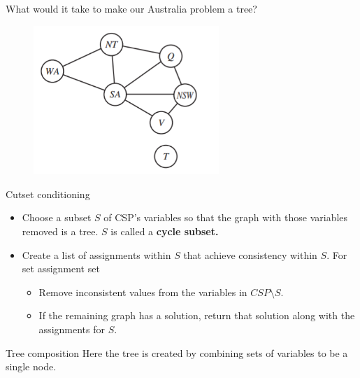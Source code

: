 \documentclass{beamer}
\begin{document}
\begin{frame}{What would it take to make our Australia problem a tree?}
    \begin{figure}
        \includegraphics[width=7cm]{images/map_graph}
    \end{figure}
    
\end{frame}

\begin{frame}{Cutset conditioning}
    \begin{itemize}
        \item Choose a subset $S$ of CSP's variables so that the graph with those
        variables removed is a tree. $S$ is called a {\bf cycle subset.}
        \item Create a list of assignments within $S$ that achieve consistency within $S$. For set assignment set
        \begin{itemize}
            \item Remove inconsistent values from the variables in $CSP\setminus S$.
            \item If the remaining graph has a solution, return that solution along with the assignments for $S$.
        \end{itemize}
    \end{itemize}
    
\end{frame}

\begin{frame}{Tree composition}
    Here the tree is created by combining sets of variables to be a single node.
    
\end{frame}
\end{document}

